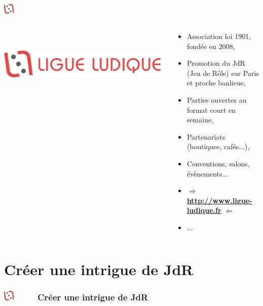 \documentclass[slidetop,11pt]{beamer}
\def\moreInFrameTitleLeftt{\includegraphics[height=0.5cm]{img/ligueludique-0.png}~~~~~}
\begin{document}
\subsubsection{\sectionPartIaUN}
\begin{frame}
	\frametitle{\moreInFrameTitleLeftt \sectionPartIaUN}
	\begin{columns}[T]
		\begin{column}[T]{3.5cm}
			\includegraphics[height=3.4cm]{img/ligueludique-1.png} %
		\end{column}
		\begin{column}[T]{7cm}
			 \begin{beamerboxesrounded}	[lower=substructureRED, %
							 upper=block title RED,%
							 shadow=true]%
				   {\sectionPartIaUN}
				\begin{itemize}
					\item Association loi 1901, fond{\'e}e en 2008, 
					\item Promotion du JdR (Jeu de R{\^o}le) sur Paris et proche banlieue, 
					\item Parties ouvertes au format court en semaine, 
					\item Partenariats (boutiques, caf{\'e}s...), 
					\item Conventions, salons, {\'e}v{\`e}nements... 
					\item $\Rightarrow$ \underline{\textbf{http://www.ligue-ludique.fr}} $\Leftarrow$
					\item ...
				\end{itemize}
			\end{beamerboxesrounded}
		\end{column}
	\end{columns}
\end{frame}


\def\sectionPartII{Cr{\'e}er une intrigue de JdR}
\section{\sectionPartII}
\begin{frame}
	\frametitle{\moreInFrameTitleLeftt \sectionPartII}
	\tableofcontents[sections=2,currentsection,subsectionstyle=show/shaded/hide] %
\end{frame} 
\end{document}
